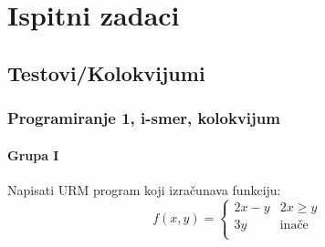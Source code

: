 \appendix
\chapter{Ispitni zadaci}

\section{Testovi/Kolokvijumi}

\subsection{Programiranje 1, i-smer, kolokvijum}
\subsubsection{Grupa I}


\begin{Exercise}[label=v1.3_01] 
Napisati URM program koji izra\v cunava funkciju:
    $$ f(x,y)= \begin{cases}
                  2x - y & 2x \geq y \\
                  3y & \text{ina\v ce} \\
                  \end{cases}  $$
\end{Exercise}
\begin{Answer}[ref=v1.3_01]
\end{Answer}



